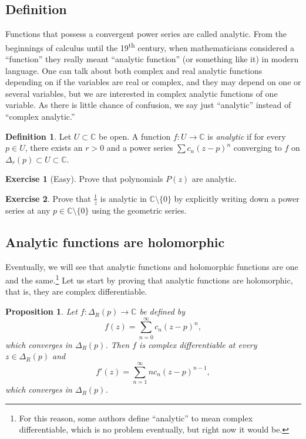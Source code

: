 \documentclass[12pt,openany]{book}
\newcommand{\C}{{\mathbb{C}}}
\newcommand{\myindex}[1]{#1\index{#1}}
\theoremstyle{plain}
\newtheorem{prop}[thm]{Proposition}
\theoremstyle{remark}
\theoremstyle{definition}
\newtheorem{defn}[thm]{Definition}
\newenvironment{exbox}{%
    \def\FrameCommand{\vrule width 1pt \relax\hspace {10pt}}%
    \MakeFramed {\advance \hsize -\width \FrameRestore }%
}{%
    \endMakeFramed
}
\theoremstyle{exercise}
\newtheorem{exercise}{Exercise}[section]
\theoremstyle{example}
\begin{document}
\subsection{Definition}

Functions that possess a convergent power series are called analytic.
From the beginnings of calculus until the 19\textsuperscript{th} century, 
when mathematicians considered a ``function'' they really meant
``analytic function'' (or something like it) in modern language.
One can talk about
both complex and real analytic functions depending on if the
variables are real or complex, and they may depend on one or several variables,
but we are interested in complex analytic functions of one variable. 
As there is little chance of confusion, we say just ``analytic'' instead of
``complex analytic.''

\begin{defn}
Let $U \subset \C$ be open.  A function $f \colon U \to \C$
is \emph{\myindex{analytic}}
if for every $p \in U$, there exists 
an $r > 0$ and a
power series $\sum c_n {(z-p)}^n$ converging to $f$ on $\Delta_r(p) \subset
U \subset \C$.
\end{defn}

\begin{exbox}
\begin{exercise}[Easy]
Prove that polynomials $P(z)$ are analytic.
\end{exercise}

\begin{exercise}
Prove that $\frac{1}{z}$ is analytic in $\C \setminus \{ 0 \}$
by explicitly writing down 
a power series at any $p \in \C \setminus \{ 0 \}$
using the geometric series.
\end{exercise}
\end{exbox}

\subsection{Analytic functions are holomorphic}

Eventually, we will see that analytic functions and holomorphic functions are
one and the same.\footnote{%
For this reason, some authors define ``analytic'' to mean complex differentiable,
which is no problem eventually, but right now it would be.}
Let us start by proving that
analytic functions are holomorphic, that is, they are complex
differentiable.

\begin{prop}
Let $f \colon \Delta_R(p) \to \C$ be defined by
\begin{equation*}
f(z) = \sum_{n=0}^\infty c_n {(z-p)}^n ,
\end{equation*}
which converges in $\Delta_R(p)$.
Then $f$ is complex differentiable at every $z \in \Delta_R(p)$ and
\begin{equation*}
f'(z) = \sum_{n=1}^\infty n c_n {(z-p)}^{n-1} ,
\end{equation*}
which converges in $\Delta_R(p)$.
\end{prop}
\end{document}
